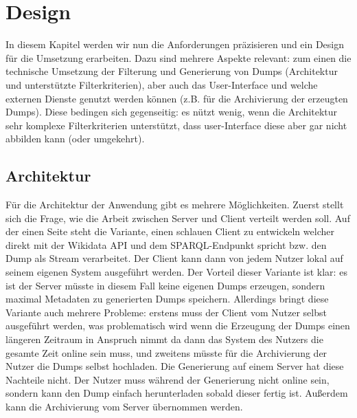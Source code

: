 \chapter{Design}
In diesem Kapitel werden wir nun die Anforderungen präzisieren und ein Design für die Umsetzung erarbeiten.
Dazu sind mehrere Aspekte relevant: zum einen die technische Umsetzung der Filterung und Generierung von Dumps (Architektur und unterstützte Filterkriterien), aber auch das User-Interface und welche externen Dienste genutzt werden können (z.B. für die Archivierung der erzeugten Dumps).
Diese bedingen sich gegenseitig: es nützt wenig, wenn die Architektur sehr komplexe Filterkriterien unterstützt, dass user-Interface diese aber gar nicht abbilden kann (oder umgekehrt).

\section{Architektur}
Für die Architektur der Anwendung gibt es mehrere Möglichkeiten.
Zuerst stellt sich die Frage, wie die Arbeit zwischen Server und Client verteilt werden soll.
Auf der einen Seite steht die Variante, einen schlauen Client zu entwickeln welcher direkt mit der Wikidata API und dem SPARQL-Endpunkt spricht bzw. den Dump als Stream verarbeitet.
Der Client kann dann von jedem Nutzer lokal auf seinem eigenen System ausgeführt werden.
Der Vorteil dieser Variante ist klar: es ist der Server müsste in diesem Fall keine eigenen Dumps erzeugen, sondern maximal Metadaten zu generierten Dumps speichern.
Allerdings bringt diese Variante auch mehrere Probleme: erstens muss der Client vom Nutzer selbst ausgeführt werden, was problematisch wird wenn die Erzeugung der Dumps einen längeren Zeitraum in Anspruch nimmt da dann das System des Nutzers die gesamte Zeit online sein muss, und zweitens müsste für die Archivierung der Nutzer die Dumps selbst hochladen.
Die Generierung auf einem Server hat diese Nachteile nicht. Der Nutzer muss während der Generierung nicht online sein, sondern kann den Dump einfach herunterladen sobald dieser fertig ist.
Außerdem kann die Archivierung vom Server übernommen werden.

